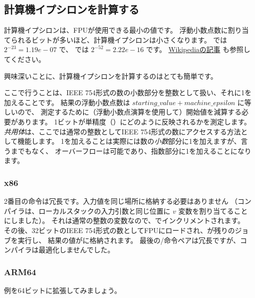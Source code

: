 ﻿\subsection{計算機イプシロンを計算する}

計算機イプシロンは、\ac{FPU}が使用できる最小の値です。 
浮動小数点数に割り当てられるビットが多いほど、計算機イプシロンは小さくなります。
\Tfloat では $2^{-23} = 1.19e-07$ で、 \Tdouble では $2^{-52} = 2.22e-16$ です。
\href{https://en.wikipedia.org/wiki/Arithmetic_underflow}{Wikipediaの記事} も参照してください。

興味深いことに、計算機イプシロンを計算するのはとても簡単です。



ここで行うことは、IEEE 754形式の数の小数部分を整数として扱い、それに1を加えることです。
結果の浮動小数点数は $starting\_value+machine\_epsilon$ に等しいので、
測定するために（浮動小数点演算を使用して）開始値を減算する必要があります。
1ビットが単精度（\Tfloat）にどのように反映されるかを測定します。
\emph{共用体}は、ここでは通常の整数としてIEEE 754形式の数にアクセスする方法として機能します。 
1を加えることは実際には数の\emph{小数}部分に1を加えますが、言うまでもなく、
オーバーフローは可能であり、指数部分に1を加えることになります。

\subsubsection{x86}



2番目の命令は冗長です。入力値を同じ場所に格納する必要はありません
（コンパイラは、ローカルスタックの入力引数と同じ位置に $v$ 変数を割り当てることにしました）。
それは通常の整数の変数なので、でインクリメントされます。 
その後、32ビットのIEEE 754形式の数としてFPUにロードされ、が残りのジョブを実行し、
結果の値がに格納されます。 
最後の/命令ペアは冗長ですが、コンパイラは最適化しませんでした。

\subsubsection{ARM64}

例を64ビットに拡張してみましょう。



